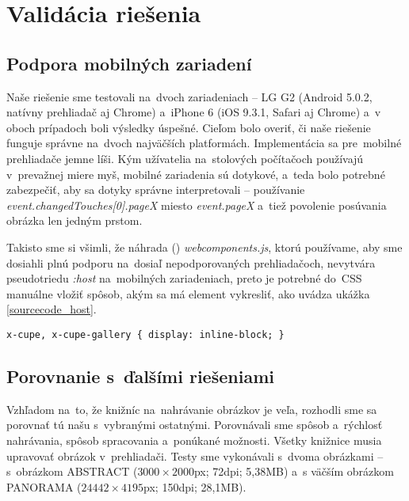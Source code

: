 \chapter{Validácia riešenia}
\section{Podpora mobilných zariadení}

Naše riešenie sme testovali na~dvoch zariadeniach -- LG G2 (Android 5.0.2, natívny prehliadač aj Chrome) a~iPhone 6 (iOS 9.3.1, Safari aj Chrome) a~v oboch prípadoch boli výsledky úspešné. Cieľom bolo overiť, či naše riešenie funguje správne na~dvoch najväčších platformách. Implementácia sa pre~mobilné prehliadače jemne líši. Kým užívatelia na~stolových počítačoch používajú v~prevažnej miere myš, mobilné zariadenia sú dotykové, a~teda bolo potrebné zabezpečiť, aby sa dotyky správne interpretovali -- používanie \emph{event.changedTouches[0].pageX} miesto \emph{event.pageX} a~tiež povolenie posúvania obrázka len jedným prstom.

Takisto sme si všimli, že náhrada () \emph{webcomponents.js}, ktorú používame, aby sme dosiahli plnú podporu na~dosiaľ nepodporovaných prehliadačoch, nevytvára pseudotriedu \emph{:host} na~mobilných zariadeniach, preto je potrebné do~CSS manuálne vložiť spôsob, akým sa má element vykresliť, ako uvádza ukážka \ref{sourcecode_host}.

\begin{lstlisting}[label=sourcecode_host,caption=Štýly potrebné pre~správne fungovanie na~mobilných zariadeniach.]
x-cupe, x-cupe-gallery { display: inline-block; }
\end{lstlisting}

\section{Porovnanie s~ďalšími riešeniami}

Vzhľadom na~to, že knižníc na~nahrávanie obrázkov je veľa, rozhodli sme sa porovnať tú našu s~vybranými ostatnými. Porovnávali sme spôsob a~rýchlosť nahrávania, spôsob spracovania a~ponúkané možnosti. Všetky knižnice musia upravovať obrázok v~prehliadači.
Testy sme vykonávali s~dvoma obrázkami -- s~obrázkom ABSTRACT ($3000\times2000$px; 72dpi; 5,38MB) a~s väčším obrázkom PANORAMA ($24442\times4195$px; 150dpi; 28,1MB).


